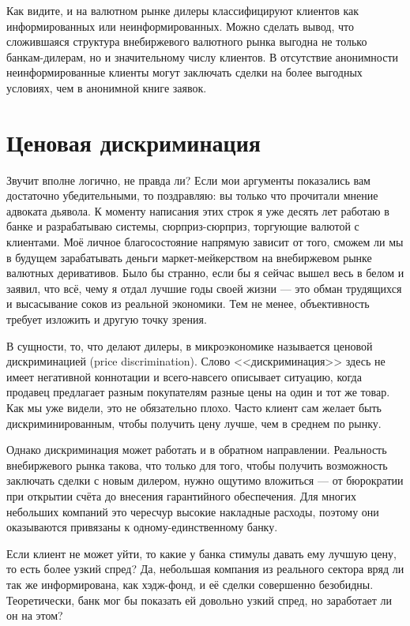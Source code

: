 Как видите, и на валютном рынке дилеры классифицируют клиентов как
информированных или неинформированных. Можно сделать вывод, что сложившаяся
структура внебиржевого валютного рынка выгодна не только банкам-дилерам, но и
значительному числу клиентов. В отсутствие анонимности неинформированные клиенты
могут заключать сделки на более выгодных условиях, чем в анонимной книге заявок.

\section*{Ценовая дискриминация}

Звучит вполне логично, не правда ли? Если мои аргументы показались вам
достаточно убедительными, то поздравляю: вы только что прочитали мнение адвоката
дьявола. К моменту написания этих строк я уже десять лет работаю в банке
и разрабатываю системы, сюрприз-сюрприз, торгующие валютой с клиентами. Моё
личное благосостояние напрямую зависит от того, сможем ли мы в будущем
зарабатывать деньги маркет-мейкерством на внебиржевом рынке валютных
деривативов. Было бы странно, если бы я сейчас вышел весь в белом и заявил, что
всё, чему я отдал лучшие годы своей жизни --- это обман трудящихся и высасывание
соков из реальной экономики. Тем не менее, объективность требует изложить и
другую точку зрения.

В сущности, то, что делают дилеры, в микроэкономике называется ценовой
дискриминацией (price discrimination). Слово <<дискриминация>> здесь не имеет
негативной коннотации и всего-навсего описывает ситуацию, когда продавец
предлагает разным покупателям разные цены на один и тот же товар. Как мы уже
видели, это не обязательно плохо. Часто клиент сам желает быть
дискриминированным, чтобы получить цену лучше, чем в среднем по рынку.

Однако дискриминация может работать и в обратном направлении. Реальность
внебиржевого рынка такова, что только для того, чтобы получить возможность
заключать сделки с новым дилером, нужно ощутимо вложиться --- от бюрократии при
открытии счёта до внесения гарантийного обеспечения. Для многих небольших
компаний это чересчур высокие накладные расходы, поэтому они оказываются
привязаны к одному-единственному банку.

Если клиент не может уйти, то какие у банка стимулы давать ему лучшую цену, то
есть более узкий спред? Да, небольшая компания из реального сектора вряд ли так
же информирована, как хэдж-фонд, и её сделки совершенно безобидны. Теоретически,
банк мог бы показать ей довольно узкий спред, но заработает ли он на этом?

